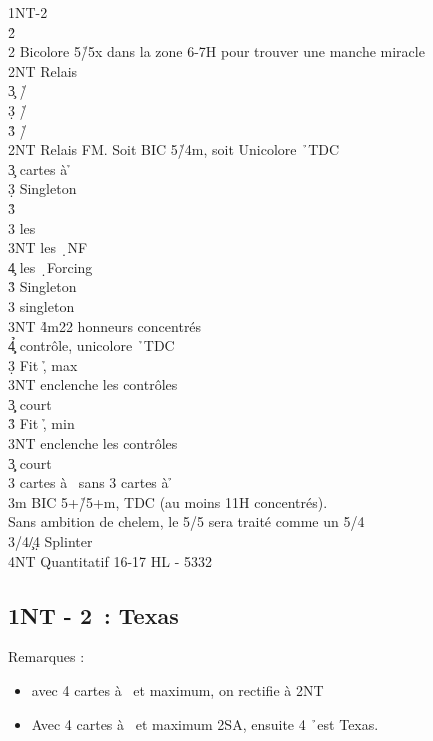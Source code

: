 \documentclass[a4paper]{article}
\begin{document}
\begin{bidtable}
1NT-2\d\\
2\h\+\\
2\s \> Bicolore 5\h /5x dans la zone 6-7H pour trouver une manche miracle\+\\
2NT \> Relais\+\\
3\c \> \h /\c \\
3\d \> \h /\d \\
3\h \> \h /\s \-\-\\
2NT \> Relais FM. Soit BIC 5\h /4m, soit Unicolore \h\ TDC\+\\
3\c {} cartes à \h \+\\
3\d \> Singleton \s \+\\
3\h\+\\
3\s \> les \c \\
3NT \> les \d\ NF\\
4\c \> les \d\ Forcing\-\-\\
3\h \> Singleton \c \\
3\s \> singleton \d \\
3NT \h 4m22 honneurs concentrés\\
4\c\d\h \> contrôle, unicolore \h\ TDC\-\\
3\d \> Fit \h , max\+\\
3NT \> enclenche les contrôles\\
3\c\d \> court\-\\
3\h \> Fit \h , min\+\\
3NT \> enclenche les contrôles\\
3\c\d \> court\-\\
3\s {} cartes à \s\ sans 3 cartes à \h \-\\
3m \> BIC 5+\h /5+m, TDC (au moins 11H concentrés).\\
\>Sans ambition de chelem, le 5/5 sera traité comme un 5/4\\
3\s/4\c/4\d \> Splinter\\
4NT \> Quantitatif 16-17 HL - 5332\-
\end{bidtable}

\subsection{1NT - 2\pdfh\ : Texas \pdfs}

Remarques :

\begin{itemize}
\item avec 4 cartes à \s\ et maximum, on rectifie à 2NT

\item Avec 4 cartes à \s\ et maximum 2SA, ensuite 4 \h\ est Texas.

\end{itemize}
\end{document}
